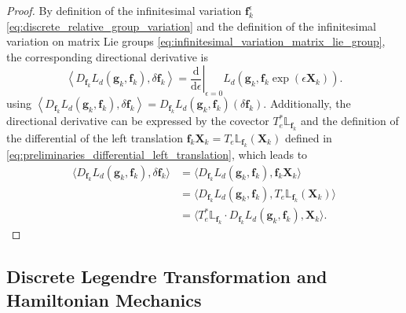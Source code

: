 \begin{proof}
By definition of the infinitesimal variation $\bm{f}_k^\epsilon$ \eqref{eq:discrete_relative_group_variation} and the definition of the infinitesimal 
variation on matrix Lie groups \eqref{eq:infinitesimal_variation_matrix_lie_group}, 
the corresponding directional derivative is
\begin{equation*}
    \left\langle D_{\bm{f}_k}L_d(\bm{g}_k,\bm{f}_k),\delta\bm{f}_k\right\rangle
    =
    \left.\frac{\mathrm d}{\mathrm d\epsilon}\right|_{\epsilon=0}
    L_d\!\left(\bm{g}_k,\bm{f}_k\exp(\epsilon \bm{X}_k)\right).
\end{equation*}
using $\left\langle D_{\bm{f}_k}L_d(\bm{g}_k,\bm{f}_k),\delta\bm{f}_k\right\rangle = D_{\bm{f}_k}L_d(\bm{g}_k,\bm{f}_k)(\delta\bm{f}_k)$.
Additionally, the directional derivative can be expressed by the covector $T_e^*\mathbb{L}_{\bm{f}_k}$ and the
definition of the differential of the left translation $\bm{f}_k \bm{X}_k = T_e\mathbb{L}_{\bm{f}_k}(\bm{X}_k)$ 
defined in \eqref{eq:preliminaries_differential_left_translation}, which leads to 
\begin{align*}    
\langle D_{\bm{f}_k}L_d(\bm{g}_k,\bm{f}_k),\delta\bm{f}_k\rangle
&= \langle D_{\bm{f}_k}L_d(\bm{g}_k,\bm{f}_k),\bm{f}_k \bm{X}_k \rangle \\
&= \langle D_{\bm{f}_k}L_d(\bm{g}_k,\bm{f}_k), T_e\mathbb{L}_{\bm{f}_k}(\bm{X}_k) \rangle \\
&= \langle T_e ^* \mathbb{L}_{\bm{f}_k} \cdot D_{\bm{f}_k}L_d(\bm{g}_k,\bm{f}_k), \bm{X}_k \rangle.
\end{align*}
\end{proof}

\subsection{Discrete Legendre Transformation and Hamiltonian Mechanics}
\label{sec:discrete_legendre_hamiltonian_mechanics}

